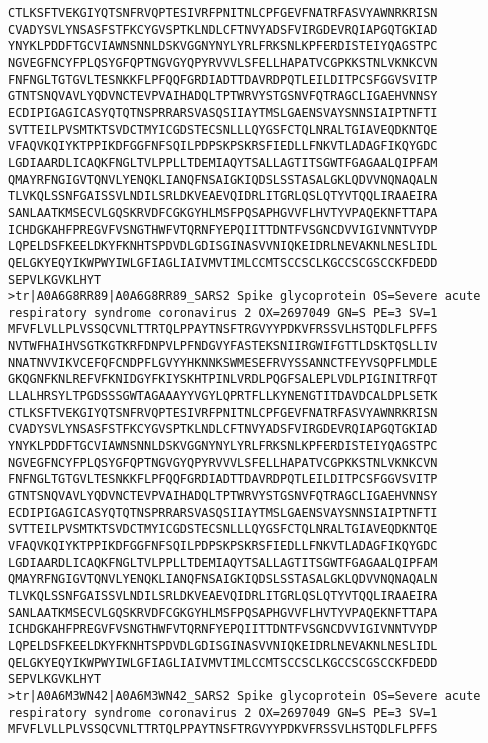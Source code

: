 \documentclass[en,black,12pt,normal]{elegantnote}
\begin{document}
\begin{lstlisting}
CTLKSFTVEKGIYQTSNFRVQPTESIVRFPNITNLCPFGEVFNATRFASVYAWNRKRISN
CVADYSVLYNSASFSTFKCYGVSPTKLNDLCFTNVYADSFVIRGDEVRQIAPGQTGKIAD
YNYKLPDDFTGCVIAWNSNNLDSKVGGNYNYLYRLFRKSNLKPFERDISTEIYQAGSTPC
NGVEGFNCYFPLQSYGFQPTNGVGYQPYRVVVLSFELLHAPATVCGPKKSTNLVKNKCVN
FNFNGLTGTGVLTESNKKFLPFQQFGRDIADTTDAVRDPQTLEILDITPCSFGGVSVITP
GTNTSNQVAVLYQDVNCTEVPVAIHADQLTPTWRVYSTGSNVFQTRAGCLIGAEHVNNSY
ECDIPIGAGICASYQTQTNSPRRARSVASQSIIAYTMSLGAENSVAYSNNSIAIPTNFTI
SVTTEILPVSMTKTSVDCTMYICGDSTECSNLLLQYGSFCTQLNRALTGIAVEQDKNTQE
VFAQVKQIYKTPPIKDFGGFNFSQILPDPSKPSKRSFIEDLLFNKVTLADAGFIKQYGDC
LGDIAARDLICAQKFNGLTVLPPLLTDEMIAQYTSALLAGTITSGWTFGAGAALQIPFAM
QMAYRFNGIGVTQNVLYENQKLIANQFNSAIGKIQDSLSSTASALGKLQDVVNQNAQALN
TLVKQLSSNFGAISSVLNDILSRLDKVEAEVQIDRLITGRLQSLQTYVTQQLIRAAEIRA
SANLAATKMSECVLGQSKRVDFCGKGYHLMSFPQSAPHGVVFLHVTYVPAQEKNFTTAPA
ICHDGKAHFPREGVFVSNGTHWFVTQRNFYEPQIITTDNTFVSGNCDVVIGIVNNTVYDP
LQPELDSFKEELDKYFKNHTSPDVDLGDISGINASVVNIQKEIDRLNEVAKNLNESLIDL
QELGKYEQYIKWPWYIWLGFIAGLIAIVMVTIMLCCMTSCCSCLKGCCSCGSCCKFDEDD
SEPVLKGVKLHYT
>tr|A0A6G8RR89|A0A6G8RR89_SARS2 Spike glycoprotein OS=Severe acute respiratory syndrome coronavirus 2 OX=2697049 GN=S PE=3 SV=1
MFVFLVLLPLVSSQCVNLTTRTQLPPAYTNSFTRGVYYPDKVFRSSVLHSTQDLFLPFFS
NVTWFHAIHVSGTKGTKRFDNPVLPFNDGVYFASTEKSNIIRGWIFGTTLDSKTQSLLIV
NNATNVVIKVCEFQFCNDPFLGVYYHKNNKSWMESEFRVYSSANNCTFEYVSQPFLMDLE
GKQGNFKNLREFVFKNIDGYFKIYSKHTPINLVRDLPQGFSALEPLVDLPIGINITRFQT
LLALHRSYLTPGDSSSGWTAGAAAYYVGYLQPRTFLLKYNENGTITDAVDCALDPLSETK
CTLKSFTVEKGIYQTSNFRVQPTESIVRFPNITNLCPFGEVFNATRFASVYAWNRKRISN
CVADYSVLYNSASFSTFKCYGVSPTKLNDLCFTNVYADSFVIRGDEVRQIAPGQTGKIAD
YNYKLPDDFTGCVIAWNSNNLDSKVGGNYNYLYRLFRKSNLKPFERDISTEIYQAGSTPC
NGVEGFNCYFPLQSYGFQPTNGVGYQPYRVVVLSFELLHAPATVCGPKKSTNLVKNKCVN
FNFNGLTGTGVLTESNKKFLPFQQFGRDIADTTDAVRDPQTLEILDITPCSFGGVSVITP
GTNTSNQVAVLYQDVNCTEVPVAIHADQLTPTWRVYSTGSNVFQTRAGCLIGAEHVNNSY
ECDIPIGAGICASYQTQTNSPRRARSVASQSIIAYTMSLGAENSVAYSNNSIAIPTNFTI
SVTTEILPVSMTKTSVDCTMYICGDSTECSNLLLQYGSFCTQLNRALTGIAVEQDKNTQE
VFAQVKQIYKTPPIKDFGGFNFSQILPDPSKPSKRSFIEDLLFNKVTLADAGFIKQYGDC
LGDIAARDLICAQKFNGLTVLPPLLTDEMIAQYTSALLAGTITSGWTFGAGAALQIPFAM
QMAYRFNGIGVTQNVLYENQKLIANQFNSAIGKIQDSLSSTASALGKLQDVVNQNAQALN
TLVKQLSSNFGAISSVLNDILSRLDKVEAEVQIDRLITGRLQSLQTYVTQQLIRAAEIRA
SANLAATKMSECVLGQSKRVDFCGKGYHLMSFPQSAPHGVVFLHVTYVPAQEKNFTTAPA
ICHDGKAHFPREGVFVSNGTHWFVTQRNFYEPQIITTDNTFVSGNCDVVIGIVNNTVYDP
LQPELDSFKEELDKYFKNHTSPDVDLGDISGINASVVNIQKEIDRLNEVAKNLNESLIDL
QELGKYEQYIKWPWYIWLGFIAGLIAIVMVTIMLCCMTSCCSCLKGCCSCGSCCKFDEDD
SEPVLKGVKLHYT
>tr|A0A6M3WN42|A0A6M3WN42_SARS2 Spike glycoprotein OS=Severe acute respiratory syndrome coronavirus 2 OX=2697049 GN=S PE=3 SV=1
MFVFLVLLPLVSSQCVNLTTRTQLPPAYTNSFTRGVYYPDKVFRSSVLHSTQDLFLPFFS

\end{lstlisting}
\end{document}
